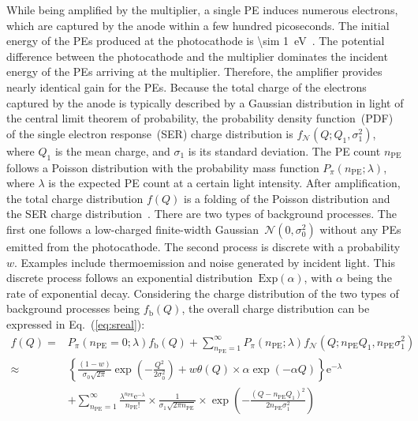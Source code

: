 While being amplified by the multiplier,
a single PE induces numerous electrons,
which are captured by the anode within a few hundred picoseconds.
The initial energy of the PEs produced at the photocathode is \SI{\sim 1}{eV}~\cite{Nathan1970TheED}.
The potential difference between the photocathode and the multiplier dominates the incident energy of the PEs arriving at the multiplier.
Therefore, the amplifier provides nearly identical gain for the PEs.
Because the total charge of the electrons captured by the anode is typically described by a Gaussian distribution in light of the central limit theorem of probability,
the probability density function~(PDF) of the single electron response~(SER) charge distribution is $f_{\mathcal{N}}(Q; Q_1,\sigma_1^2)$,
where $Q_1$ is the mean charge, and $\sigma_1$ is its standard deviation.
The PE count $n_{\mathrm{PE}}$ follows a Poisson distribution with the probability mass function $P_\pi(n_{\mathrm{PE}};\lambda)$,
where $\lambda$ is the expected PE count at a certain light intensity.
After amplification, the total charge distribution $f(Q)$ is a folding of the Poisson distribution and the SER charge distribution~\cite{1994Absolute}.
There are two types of background processes.
The first one follows a low-charged finite-width Gaussian~$\mathcal{N}(0,\sigma_0^2)$ without any PEs emitted from the photocathode.
The second process is discrete with a probability $w$.
Examples include thermoemission and noise generated by incident light.
This discrete process follows an exponential distribution~$\mathrm{Exp}(\alpha)$,
with $\alpha$ being the rate of exponential decay.
Considering the charge distribution of the two types of background processes being $f_{\mathrm{b}}(Q)$,
the overall charge distribution can be expressed in Eq.~(\ref{eq:sreal}):
\begin{equation}
	\begin{aligned}
		f(Q) =  & P_{\pi}(n_{\mathrm{PE}}=0;\lambda)f_{\mathrm{b}}(Q) + \sum_{n_{\mathrm{PE}}=1}^{\infty}P_{\pi}(n_{\mathrm{PE}};\lambda) f_{\mathcal{N}}(Q; n_{\mathrm{PE}}Q_1,n_{\mathrm{PE}}\sigma_1^2) \\
		\approx & \left\{\frac{(1-w)}{\sigma_0 \sqrt{2 \pi}} \exp \left(-\frac{Q^2}{2 \sigma_0^2}\right)
		+w \theta(Q)\times \alpha \exp \left(-\alpha Q\right)\right\} \mathrm{e}^{-\lambda}                                                                                                                \\
		        & +\sum_{n_{\mathrm{PE}}=1}^{\infty} \frac{\lambda^{n_{\mathrm{PE}}} \mathrm{e}^{-\lambda}}{n_{\mathrm{PE}} !}
		\times \frac{1}{\sigma_1 \sqrt{2 \pi n_{\mathrm{PE}}}}\times
		\exp \left(-\frac{\left(Q-n_{\mathrm{PE}} Q_1\right)^2}{2 n_{\mathrm{PE}} \sigma_1^2}\right)
	\end{aligned}
	\label{eq:sreal}
\end{equation}
